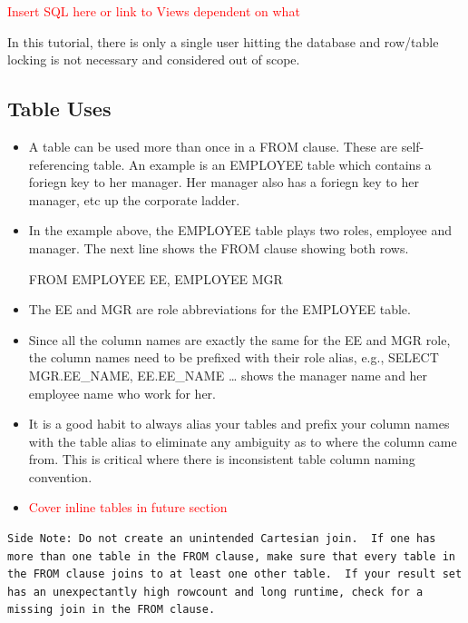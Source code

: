 \documentclass[]{book}
\theoremstyle{definition}
\theoremstyle{definition}
\theoremstyle{definition}
\theoremstyle{remark}
\begin{document}
\textcolor{red}{Insert SQL here or link to Views dependent on what}

In this tutorial, there is only a single user hitting the database and
row/table locking is not necessary and considered out of scope.

\hypertarget{table-uses}{%
\subsection{Table Uses}\label{table-uses}}

\begin{itemize}
\item
  A table can be used more than once in a FROM clause. These are
  self-referencing table. An example is an EMPLOYEE table which contains
  a foriegn key to her manager. Her manager also has a foriegn key to
  her manager, etc up the corporate ladder.\\
\item
  In the example above, the EMPLOYEE table plays two roles, employee and
  manager. The next line shows the FROM clause showing both rows.

  FROM EMPLOYEE EE, EMPLOYEE MGR
\item
  The EE and MGR are role abbreviations for the EMPLOYEE table.\\
\item
  Since all the column names are exactly the same for the EE and MGR
  role, the column names need to be prefixed with their role alias,
  e.g., SELECT MGR.EE\_NAME, EE.EE\_NAME \ldots{} shows the manager name
  and her employee name who work for her.
\item
  It is a good habit to always alias your tables and prefix your column
  names with the table alias to eliminate any ambiguity as to where the
  column came from. This is critical where there is inconsistent table
  column naming convention.
\item
  \textcolor{red}{Cover inline tables in future section}
\end{itemize}

\begin{verbatim}
Side Note: Do not create an unintended Cartesian join.  If one has more than one table in the FROM clause, make sure that every table in the FROM clause joins to at least one other table.  If your result set has an unexpectantly high rowcount and long runtime, check for a missing join in the FROM clause.
\end{verbatim}
\end{document}
